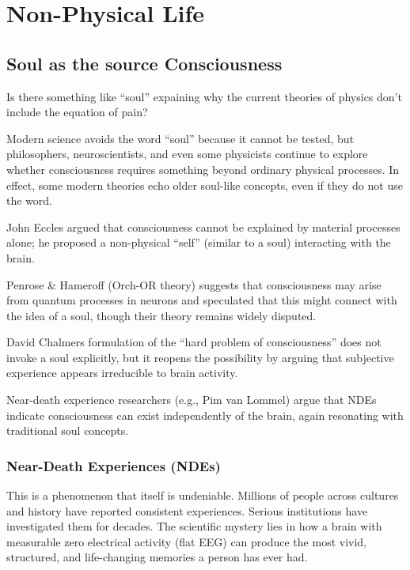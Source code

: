 \chapter{Non-Physical Life}
\label{chap:no-physical-life}

\section{Soul as the source Consciousness}

Is there something like ``soul'' expaining why the current theories of physics don't include the equation of pain?

Modern science avoids the word ``soul'' because it cannot be tested, but philosophers, neuroscientists, and even some physicists continue to explore whether consciousness requires something beyond ordinary physical processes. In effect, some modern theories echo older soul-like concepts, even if they do not use the word.

John Eccles argued that consciousness cannot be explained by material processes alone; he proposed a non-physical ``self'' (similar to a soul) interacting with the brain.

Penrose \& Hameroff (Orch-OR theory) suggests that consciousness may arise from quantum processes in neurons and speculated that this might connect with the idea of a soul,
though their theory remains widely disputed.

David Chalmers formulation of the ``hard problem of consciousness'' does not invoke a soul explicitly, but it reopens the possibility by arguing that
subjective experience appears irreducible to brain activity.

Near-death experience researchers (e.g., Pim van Lommel) argue that NDEs indicate consciousness can exist independently of the brain, again resonating with
traditional soul concepts.


\subsection*{Near-Death Experiences (NDEs)}

This is a phenomenon that itself is undeniable. Millions of people across cultures and history have reported consistent experiences.
Serious institutions have investigated them for decades. The scientific mystery lies in how a brain with measurable zero electrical activity  (flat EEG) can
produce the most vivid, structured, and life-changing memories a person has ever had. 

